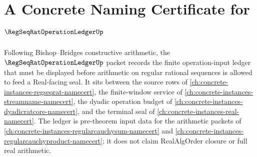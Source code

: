 \chapter{A Concrete Naming Certificate for $\RegSeqRatOperationLedgerUp$}
\label{ch:concrete-instances-regseqrat-operation-ledger-namecert}

Following Bishop--Bridges constructive arithmetic, the $\RegSeqRatOperationLedgerUp$ packet records the finite operation-input ledger that must be displayed before arithmetic on regular rational sequences is allowed to feed a Real-facing seal. It sits between the source rows of \autoref{ch:concrete-instances-regseqrat-namecert}, the finite-window service of \autoref{ch:concrete-instances-streamname-namecert}, the dyadic operation budget of \autoref{ch:concrete-instances-dyadicratcore-namecert}, and the terminal seal of \autoref{ch:concrete-instances-real-namecert}. The ledger is pre-theorem input data for the arithmetic packets of \autoref{ch:concrete-instances-regularcauchysum-namecert} and \autoref{ch:concrete-instances-regularcauchyproduct-namecert}; it does not claim RealAlgOrder closure or full real arithmetic.

